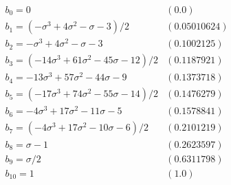 \[\begin{array}{ll}
b_{0} = 0 & (0.0) \\
b_{1} = (- \sigma^{3} + 4 \sigma^{2} - \sigma - 3)/2 & (0.05010624) \\
b_{2} = - \sigma^{3} + 4 \sigma^{2} - \sigma - 3 & (0.1002125) \\
b_{3} = (- 14 \sigma^{3} + 61 \sigma^{2} - 45 \sigma - 12)/2 & (0.1187921) \\
b_{4} = - 13 \sigma^{3} + 57 \sigma^{2} - 44 \sigma - 9 & (0.1373718) \\
b_{5} = (- 17 \sigma^{3} + 74 \sigma^{2} - 55 \sigma - 14)/2 & (0.1476279) \\
b_{6} = - 4 \sigma^{3} + 17 \sigma^{2} - 11 \sigma - 5 & (0.1578841) \\
b_{7} = (- 4 \sigma^{3} + 17 \sigma^{2} - 10 \sigma - 6)/2 & (0.2101219) \\
b_{8} = \sigma - 1 & (0.2623597) \\
b_{9} = \sigma/2 & (0.6311798) \\
b_{10} = 1 & (1.0)
\end{array}\]
